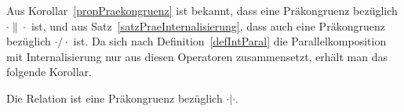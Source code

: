 Aus Korollar~\ref{propPraekongruenz} ist bekannt, dass \ERel{} eine Präkongruenz
bezüglich $\cdot\|\cdot$ ist, und aus Satz~\ref{satzPraeInternalisierung}, dass
\ERel{} auch eine Präkongruenz bezüglich $\cdot/\cdot$ ist. Da sich nach
Definition~\ref{defIntParal} die Parallelkomposition mit Internalisierung nur
aus diesen Operatoren zusammensetzt, erhält man das folgende Korollar.

\begin{kor}
  Die Relation \ERel{} ist eine Präkongruenz bezüglich $\cdot|\cdot$.
\end{kor}
